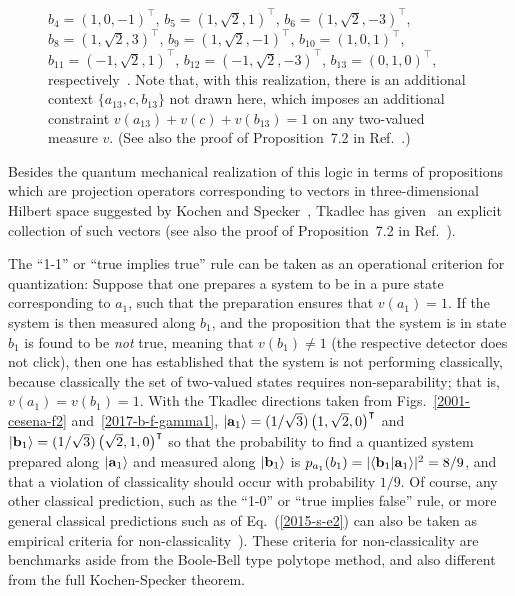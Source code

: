 \documentclass[%
  twocolumn,
 showpacs,
 showkeys,
 preprintnumbers,
 amsmath,amssymb,
 aps,
  pra,
  longbibliography,
 floatfix,
 ]{revtex4-1}
\begin{document}
\begin{figure}
{$b_{4}     = \left(    1,0,-1     \right)^\intercal $,
$b_{5}     = \left(    1,\sqrt{2},1     \right)^\intercal $,
$b_{6}     = \left(1, \sqrt{2}, -3 \right)^\intercal $,
$b_{8}     = \left(1, \sqrt{2}, 3 \right)^\intercal $,
$b_{9}     = \left(    1,\sqrt{2},-1     \right)^\intercal $,
$b_{10}     = \left(    1,0,1     \right)^\intercal $,
$b_{11}     = \left(    -1,\sqrt{2},1     \right)^\intercal $,
$b_{12}     = \left(-1, \sqrt{2}, -3 \right)^\intercal $,
$b_{13}     = \left(    0,1,0     \right)^\intercal $,
respectively~\cite[p.~206, Fig.~1]{tkadlec-96}.
Note that, with this realization, there is an additional context $\{ a_{13},c,b_{13}\}$ not drawn here,
which imposes an additional constraint $v(a_{13})+v(c)+v(b_{13})=1$ on any two-valued measure $v$.
(See also the proof of Proposition~7.2 in Ref.~\cite[p.~5392]{svozil-tkadlec}.)
}
\end{figure}

Besides the  quantum mechanical realization of this logic in terms of propositions which are projection operators
corresponding to vectors in three-dimensional Hilbert space suggested by Kochen and Specker~\cite{kochen1},
Tkadlec has given~\cite[p.~206, Fig.~1]{tkadlec-96}  an explicit collection of such vectors
(see also the proof of Proposition~7.2 in Ref.~\cite[p.~5392]{svozil-tkadlec}).


The ``1-1'' or  ``true implies true'' rule can be taken as an operational criterion for quantization:
Suppose that one prepares a system to be in a pure state
corresponding to $a_1$, such that the preparation ensures that $v(a_1)=1$.
If the system is then measured along $b_1$, and the proposition that
the system is in state $b_1$  is found  to be {\em not} true, meaning that $v(b_1)\neq 1$ (the respective detector does not click),
then  one has established that the system is not performing classically,
because classically the set of two-valued states requires non-separability; that is, $v(a_1)=v(b_1)=1$.
With the Tkadlec directions taken from Figs.~\ref{2001-cesena-f2} and~\ref{2017-b-f-gamma1},
$\vert {\bf a}_1\rangle = (1/\sqrt{3}) \left(    1,\sqrt{2},0     \right)^\intercal$ and
$\vert {\bf b}_1\rangle = (1/\sqrt{3})\left(     \sqrt{2},1,0      \right)^\intercal$
so that the probability to find a quantized system prepared along $\vert {\bf a}_1\rangle$
and measured along $\vert {\bf b}_1\rangle$ is
$p_{a_1}(b_1) = \vert \langle {\bf b}_1 \vert {\bf a}_1 \rangle \vert^2=  8/9  $,
and that a violation of classicality should occur with probability $1/9$.
Of course, any other classical prediction, such as the ``1-0'' or ``true implies false'' rule,
or more general  classical predictions such as of Eq.~(\ref{2015-s-e2})
can also be taken as empirical criteria for non-classicality~\cite[Sect.~11.3.2.]{svozil-2016-s}).
These criteria for non-classicality are benchmarks aside from the Boole-Bell type polytope method,
and also different from the full Kochen-Specker theorem.
\end{document}
